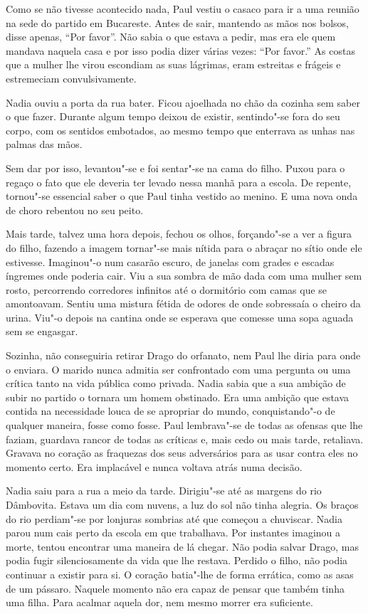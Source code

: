 Como se não tivesse acontecido nada, Paul vestiu o casaco para ir a uma
reunião na sede do partido em Bucareste. Antes de sair, mantendo as
mãos nos bolsos, disse apenas, ``Por favor''. Não sabia o que estava a
pedir, mas era ele quem mandava naquela casa e por isso podia dizer
várias vezes: ``Por favor.'' As costas que a mulher lhe virou escondiam as
suas lágrimas, eram estreitas e frágeis e estremeciam convulsivamente.

Nadia ouviu a porta da rua bater. Ficou ajoelhada no chão da cozinha sem
saber o que fazer. Durante algum tempo deixou de existir, sentindo"-se
fora do seu corpo, com os sentidos embotados, ao mesmo tempo que enterrava as unhas nas palmas das mãos.

Sem dar por isso, levantou"-se e foi sentar"-se na cama do filho. Puxou
para o regaço o fato que ele deveria ter levado nessa manhã para a %
escola. De repente, tornou"-se essencial saber o que Paul tinha vestido
ao menino. E uma nova onda de choro rebentou no seu peito.

Mais tarde, talvez uma hora depois, fechou os olhos, forçando"-se a ver a
figura do filho, fazendo a imagem tornar"-se mais nítida para o abraçar
no sítio onde ele estivesse. Imaginou"-o num casarão escuro, de janelas
com grades e escadas íngremes onde poderia cair. Viu a sua sombra de mão
dada com uma mulher sem rosto, percorrendo corredores infinitos até o
dormitório com camas que se amontoavam. Sentiu uma mistura fétida de
odores de onde sobressaía o cheiro da urina. Viu"-o depois na cantina
onde se esperava que comesse uma sopa aguada sem se engasgar.

Sozinha, não conseguiria retirar Drago do orfanato, nem Paul lhe diria
para onde o enviara. O marido nunca admitia ser confrontado com uma
pergunta ou uma crítica tanto na vida pública como privada. Nadia sabia
que a sua ambição de subir no partido o tornara um homem obstinado. Era
uma ambição que estava contida na necessidade louca de se apropriar do
mundo, conquistando"-o de qualquer maneira, fosse como fosse. Paul
lembrava"-se de todas as ofensas que lhe faziam, guardava rancor de todas
as críticas e, mais cedo ou mais tarde, retaliava. Gravava no coração as
fraquezas dos seus adversários para as usar contra eles no momento
certo. Era implacável e nunca voltava atrás numa decisão.

Nadia saiu
para a rua a meio da tarde. Dirigiu"-se até as margens do rio Dâmbovita.
Estava um dia com nuvens, a
luz do sol não tinha alegria. Os braços do rio perdiam"-se por lonjuras
sombrias até que começou a chuviscar. Nadia parou num cais perto da
escola em que trabalhava. Por instantes imaginou a morte, tentou
encontrar uma maneira de lá chegar. Não podia salvar Drago, mas podia
fugir silenciosamente da vida que lhe restava. Perdido o filho, não
podia continuar a existir para si. O coração batia"-lhe de forma
errática, como as asas de um pássaro. Naquele momento não era capaz de
pensar que também tinha uma filha. Para acalmar aquela dor, nem mesmo
morrer era suficiente.

